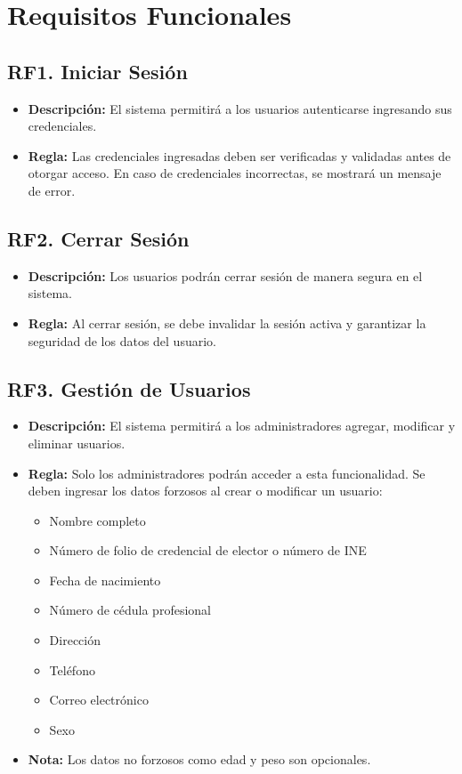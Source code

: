 \documentclass{article}
\begin{document}
\newpage
\section{Requisitos Funcionales}

\subsection{RF1. Iniciar Sesión}
\begin{itemize}
    \item \textbf{Descripción:} El sistema permitirá a los usuarios autenticarse ingresando sus credenciales.
    \item \textbf{Regla:} Las credenciales ingresadas deben ser verificadas y validadas antes de otorgar acceso. En caso de credenciales incorrectas, se mostrará un mensaje de error.
\end{itemize}

\subsection{RF2. Cerrar Sesión}
\begin{itemize}
    \item \textbf{Descripción:} Los usuarios podrán cerrar sesión de manera segura en el sistema.
    \item \textbf{Regla:} Al cerrar sesión, se debe invalidar la sesión activa y garantizar la seguridad de los datos del usuario.
\end{itemize}

\subsection{RF3. Gestión de Usuarios}
\begin{itemize}
    \item \textbf{Descripción:} El sistema permitirá a los administradores agregar, modificar y eliminar usuarios.
    \item \textbf{Regla:} Solo los administradores podrán acceder a esta funcionalidad. Se deben ingresar los datos forzosos al crear o modificar un usuario:
    \begin{itemize}
        \item Nombre completo
        \item Número de folio de credencial de elector o número de INE
        \item Fecha de nacimiento
        \item Número de cédula profesional
        \item Dirección
        \item Teléfono
        \item Correo electrónico
        \item Sexo
    \end{itemize}
    \item \textbf{Nota:} Los datos no forzosos como edad y peso son opcionales.
\end{itemize}
\end{document}
